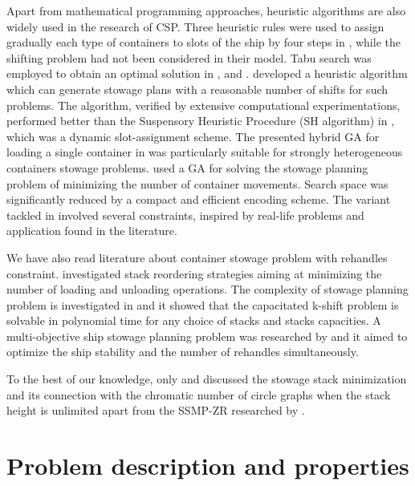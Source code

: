 \documentclass[review,3p,times,authoryear,12pt]{elsarticle}
\begin{document}
Apart from mathematical programming approaches, heuristic algorithms are also widely used in the research of CSP.
Three heuristic rules were used to assign gradually each type of containers to slots of the ship by four steps in \cite{scott1978loading}, while the shifting problem had not been considered in their model.
Tabu search was employed to obtain an optimal solution in \cite{wilson2001container}, \cite{bortfeldt2003parallel} and \cite{monaco2014terminal}.
\cite{ding2015stowage} developed a heuristic algorithm which can generate stowage plans with a reasonable number of shifts for such problems.
The algorithm, verified by extensive computational experimentations, performed better than the Suspensory Heuristic Procedure (SH algorithm) in \cite{avriel1998stowage}, which was a dynamic slot-assignment scheme.
The presented hybrid GA for loading a single container in \cite{bortfeldt2001hybrid} was particularly suitable for strongly heterogeneous containers stowage problems.
\cite{dubrovsky2002genetic}  used a GA for solving the stowage planning problem of minimizing the number of container movements.
Search space was significantly reduced by a compact and efficient encoding scheme.
The variant tackled in \cite{cohen2017container} involved several constraints, inspired by real-life problems and application found in the literature.

We have also read literature about container stowage problem with rehandles constraint.
\cite{malucelli2008stack} investigated stack reordering strategies aiming at minimizing the number of loading and unloading operations.
The complexity of stowage planning problem is investigated in \cite{tierney2014complexity} and it showed that the capacitated k-shift problem is solvable in polynomial time for any choice of stacks and stacks capacities.
A multi-objective ship stowage planning problem was researched by \cite{zhang2016multiobjective} and it aimed to optimize the ship stability and the number of rehandles simultaneously.

To the best of our knowledge, only \cite{avriel2000container} and \cite{jensen2010complexity} discussed the stowage stack minimization and its connection with the chromatic number of circle graphs when the stack height is unlimited apart from the SSMP-ZR researched by \cite{wang2014stowage}.


\section{Problem description and properties}
\label{sec:pd}
\end{document}
